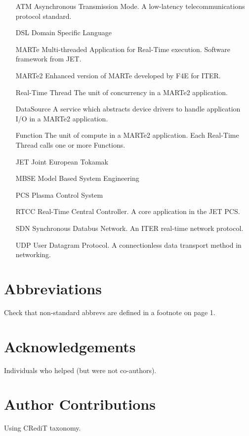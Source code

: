 \documentclass[preprint,12pt]{elsarticle}
\begin{document}
\begin{itemize}
\item[ATM]{Asynchronous Transmission Mode.  A low-latency telecommunications protocol standard.}
\item[DSL]{Domain Specific Language}
\item[MARTe]{Multi-threaded Application for Real-Time execution.  Software framework from JET.}
\item[MARTe2]{Enhanced version of MARTe developed by F4E for ITER.}
\item[Real-Time Thread]{The unit of concurrency in a MARTe2 application.}
\item[DataSource]{A service which abstracts device drivers to handle application I/O in a MARTe2 application.}
\item[Function]{The unit of compute in a MARTe2 application.  Each Real-Time Thread calls one or more Functions.}
\item[JET]{Joint European Tokamak}
\item[MBSE]{Model Based System Engineering}
\item[PCS]{Plasma Control System}
\item[RTCC]{Real-Time Central Controller.  A core application in the JET PCS.}
\item[SDN]{Synchronous Databus Network.  An ITER real-time network protocol.}
\item[UDP]{User Datagram Protocol. A connectionless data transport method in networking.}
\end{itemize}

\section{Abbreviations}

Check that non-standard abbrevs are defined in a footnote on page 1.

\section{Acknowledgements}

Individuals who helped (but were not co-authors).

\section{Author Contributions}
Using CRediT taxonomy.
\end{document}
